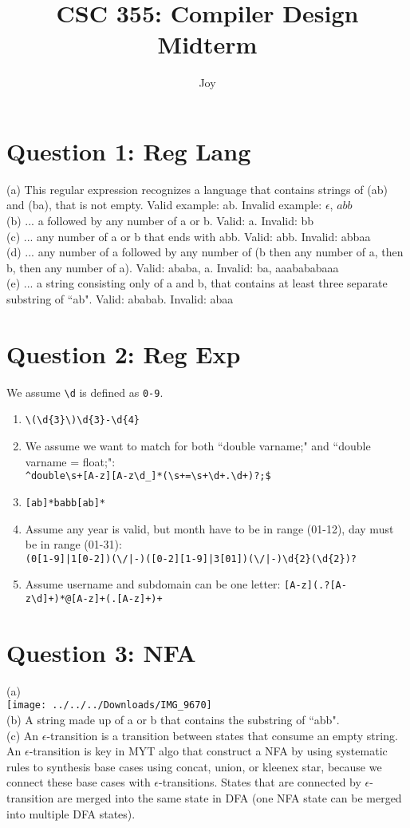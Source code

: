 \documentclass{article}
\title{CSC 355: Compiler Design Midterm}
\author{Joy}
\begin{document}
\maketitle
\pagebreak
\noindent
\section*{Question 1: Reg Lang}
(a) This regular expression recognizes a language that contains strings of (ab) and (ba), that is not empty. Valid example: ab. Invalid example: $\epsilon$, $abb$
\\
(b) ... a followed by any number of a or b. Valid: a. Invalid: bb
\\
(c) ... any number of a or b that ends with abb. Valid: abb. Invalid: abbaa
\\
(d) ... any number of a followed by any number of (b then any number of a, then b, then any number of a). Valid: ababa, a. Invalid: ba, aaabababaaa
\\
(e) ... a string consisting only of a and b, that contains at least three separate substring of ``ab". Valid: ababab. Invalid: abaa
\section*{Question 2: Reg Exp}
We assume \verb|\d| is defined as \verb|0-9|.
\begin{enumerate}
  \item \verb|\(\d{3}\)\d{3}-\d{4}|
  \item We assume we want to match for both ``double varname;" and ``double varname = float;":\\ \verb|^double\s+[A-z][A-z\d_]*(\s+=\s+\d+.\d+)?;$|
  \item \verb|[ab]*babb[ab]*|
  \item Assume any year is valid, but month have to be in range (01-12), day must be in range (01-31): \\\verb!(0[1-9]|1[0-2])(\/|-)([0-2][1-9]|3[01])(\/|-)\d{2}(\d{2})?!
  \item Assume username and subdomain can be one letter: \verb|[A-z](.?[A-z\d]+)*@[A-z]+(.[A-z]+)+|
\end{enumerate}
\section*{Question 3: NFA}
(a) 
\\
\texttt{[image: ../../../Downloads/IMG\_9670]}
\\
(b) A string made up of a or b that contains the substring of ``abb".
\\
(c) An $\epsilon$-transition is a transition between states that consume an empty string. An $\epsilon$-transition is key in MYT algo that construct a NFA by using systematic rules to synthesis base cases using concat, union, or kleenex star, because we connect these base cases with $\epsilon$-transitions. States that are connected by $\epsilon$-transition are merged into the same state in DFA (one NFA state can be merged into multiple DFA states). 
\end{document}
